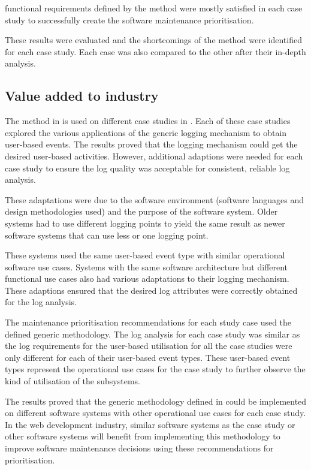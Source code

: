 functional requirements defined by the method were mostly satisfied in each case study to successfully create the software maintenance prioritisation.\par These results were evaluated and the shortcomings of the method were identified for each case study. Each case was also compared to the other after their in-depth analysis.

\clearpage

\subsection{Value added to industry}
The method in  is used on different case studies in . Each of these case studies explored the various applications of the generic logging mechanism to obtain user-based events. The results proved that the logging mechanism could get the desired user-based activities. However, additional adaptions were needed for each case study to ensure the log quality was acceptable for consistent, reliable log analysis.\par These adaptations were due to the software environment (software languages and design methodologies used) and the purpose of the software system. Older systems had to use different logging points to yield the same result as newer software systems that can use less or one logging point.\par These systems used the same user-based event type with similar operational software use cases. Systems with the same software architecture but different functional use cases also had various adaptations to their logging mechanism. These adaptions ensured that the desired log attributes were correctly obtained for the log analysis. \par The maintenance prioritisation recommendations for each study case used the defined generic methodology. The log analysis for each case study was similar as the log requirements for the user-based utilisation for all the case studies were only different for each of their user-based event types. These user-based event types represent the operational use cases for the case study to further observe the kind of utilisation of the subsystems. \par The results proved that the generic methodology defined in  could be implemented on different software systems with other operational use cases for each case study. In the web development industry, similar software systems as the case study or other software systems will benefit from implementing this methodology to improve software maintenance decisions using these recommendations for prioritisation.

